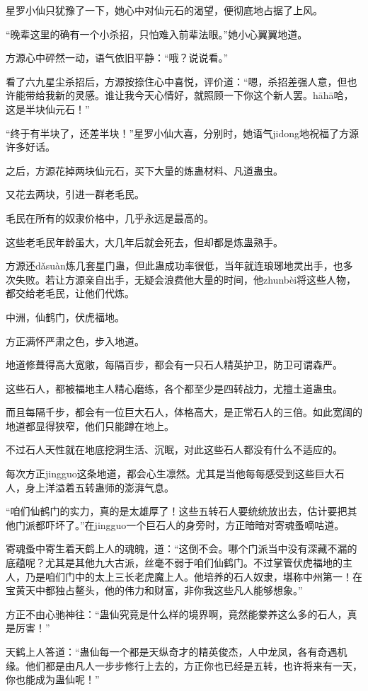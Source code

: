 \begin{this_body}
星罗小仙只犹豫了一下，她心中对仙元石的渴望，便彻底地占据了上风。

“晚辈这里的确有一个小杀招，只怕难入前辈法眼。”她小心翼翼地道。

方源心中砰然一动，语气依旧平静：“哦？说说看。”

看了六九星尘杀招后，方源按捺住心中喜悦，评价道：“嗯，杀招差强人意，但也许能带给我新的灵感。谁让我今天心情好，就照顾一下你这个新人罢。hāhā哈，这是半块仙元石！”

“终于有半块了，还差半块！”星罗小仙大喜，分别时，她语气jidong地祝福了方源许多好话。

之后，方源花掉两块仙元石，买下大量的炼蛊材料、凡道蛊虫。

又花去两块，引进一群老毛民。

毛民在所有的奴隶价格中，几乎永远是最高的。

这些老毛民年龄虽大，大几年后就会死去，但却都是炼蛊熟手。

方源还dǎsuàn炼几套星门蛊，但此蛊成功率很低，当年就连琅琊地灵出手，也多次失败。若让方源亲自出手，无疑会浪费他大量的时间，他zhunbèi将这些人物，都交给老毛民，让他们代炼。

中洲，仙鹤门，伏虎福地。

方正满怀严肃之色，步入地道。

地道修葺得高大宽敞，每隔百步，都会有一只石人精英护卫，防卫可谓森严。

这些石人，都被福地主人精心磨练，各个都至少是四转战力，尤擅土道蛊虫。

而且每隔千步，都会有一位巨大石人，体格高大，是正常石人的三倍。如此宽阔的地道都显得狭窄，他们只能蹲在地上。

不过石人天性就在地底挖洞生活、沉眠，对此这些石人都没有什么不适应的。

每次方正jingguo这条地道，都会心生凛然。尤其是当他每每感受到这些巨大石人，身上洋溢着五转蛊师的澎湃气息。

“咱们仙鹤门的实力，真的是太雄厚了！这些五转石人要统统放出去，估计要把其他门派都吓坏了。”在jingguo一个巨石人的身旁时，方正暗暗对寄魂蚤嘀咕道。

寄魂蚤中寄生着天鹤上人的魂魄，道：“这倒不会。哪个门派当中没有深藏不漏的底蕴呢？尤其是其他九大古派，丝毫不弱于咱们仙鹤门。不过掌管伏虎福地的主人，乃是咱们门中的太上三长老虎魔上人。他培养的石人奴隶，堪称中州第一！在宝黄天中都独占鳌头，他的伟力和财富，非你我这些凡人能够想象。”

方正不由心驰神往：“蛊仙究竟是什么样的境界啊，竟然能豢养这么多的石人，真是厉害！”

天鹤上人答道：“蛊仙每一个都是天纵奇才的精英俊杰，人中龙凤，各有奇遇机缘。他们都是由凡人一步步修行上去的，方正你也已经是五转，也许将来有一天，你也能成为蛊仙呢！”


\end{this_body}

